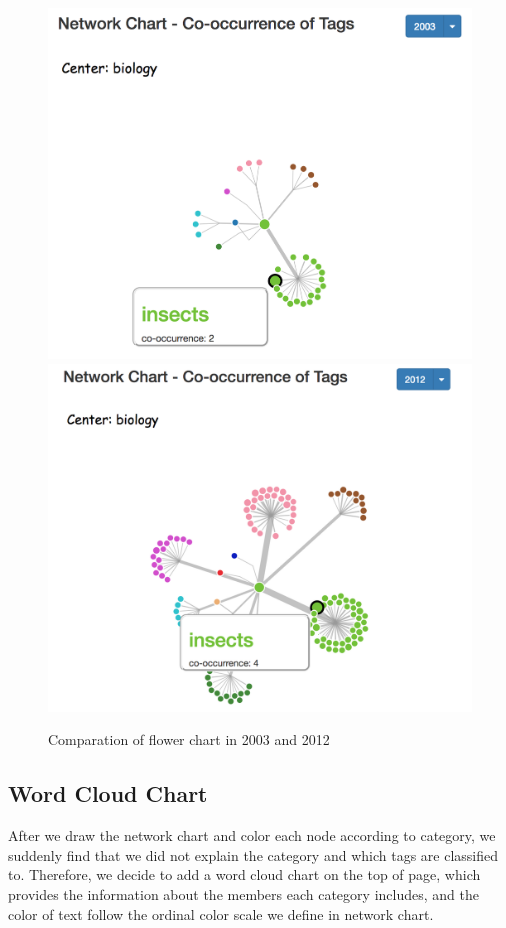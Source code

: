 \documentclass{report}
\numberwithin{figure}{section}
\begin{document}
\begin{figure}
\begin{center}
\includegraphics[scale=0.33]{biology2003}
\includegraphics[scale=0.33]{biology2012}
\caption{Comparation of flower chart in 2003 and 2012}
\label{fig:compareyear}
\end{center}
\end{figure}

\subsection{Word Cloud Chart}
\quad After we draw the network chart and color each node according to category, we suddenly find that we did not explain the category and which tags are classified to. Therefore, we decide to add a word cloud chart on the top of page, which provides the information about the members each category includes, and the color of text follow the ordinal color scale we define in network chart. 
\end{document}
